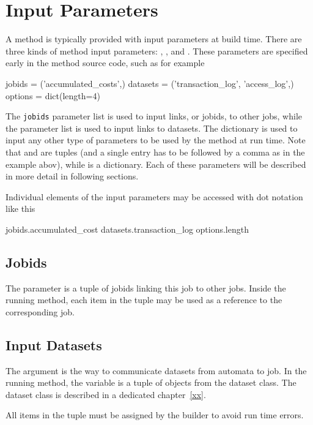 \section{Input Parameters}
A method is typically provided with input parameters at build time.
There are three kinds of method input parameters: \jobids, \datasets,
and \options.  These parameters are specified early in the method
source code, such as for example
\begin{python}
jobids = ('accumulated_costs',)
datasets = ('transaction_log', 'access_log',)
options = dict(length=4)
\end{python}
The \texttt{jobids} parameter list is used to input links, or jobids,
to other jobs, while the \datasets parameter list is used to input
links to datasets. The \options dictionary is used to input any other
type of parameters to be used by the method at run time.  Note that
\jobids and \datasets are tuples (and a single entry has to be
followed by a comma as in the example abov), while \options is a
dictionary.  Each of these parameters will be described in more detail
in following sections.

Individual elements of the input parameters may be accessed with dot
notation like this
\begin{python}
jobids.accumulated_cost
datasets.transaction_log
options.length
\end{python}



\subsection*{Jobids}
The \jobids parameter is a tuple of jobids linking this job to other
jobs.  Inside the running method, each item in the \jobids tuple may
be used as a reference to the corresponding job.




\subsection*{Input Datasets}
The \datasets argument is the way to communicate datasets from
automata to job.  In the running method, the \datasets variable is a
tuple of objects from the dataset class.  The dataset class is
described in a dedicated chapter~\ref{xx}.

All items in the \datasets tuple must be assigned by the builder to
avoid run time errors.


